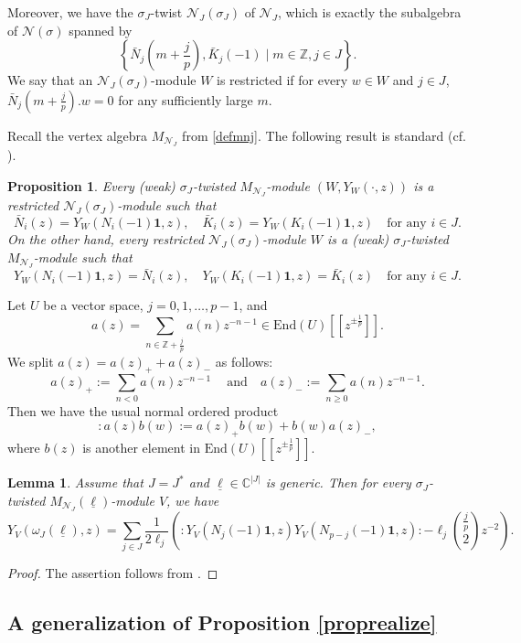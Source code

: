 \documentclass[12pt, reqno]{amsart}
\numberwithin{equation}{section}
\newtheorem{lemma}[theorem]{Lemma}%
\newtheorem{proposition}[theorem]{Proposition}%
\numberwithin{equation}{section}
\def\({\left(}
\def\){\right)}
\newcommand{\C}{\mathbb C}
\newcommand{\Z}{\mathbb{Z}}
\newcommand{\CN}{\mathcal{N}}
\begin{document}
Moreover, we have the $\sigma_J$-twist $\CN_J(\sigma_J)$ of $\CN_J$,
which is exactly the subalgebra of $\CN(\sigma)$ spanned by
\[
\left\{\bar{N}_j(m+\frac{j}{p}), \bar{K}_j(-1) \mid m\in \Z, j\in J\right\}.
\]
We say that an $\CN_J(\sigma_J)$-module $W$ is restricted if for every $w\in W$ and $j\in J$, $\bar{N}_j(m+\frac{j}{p}).w=0$ for any sufficiently large $m$.

Recall the vertex algebra $M_{\CN_J}$ from \eqref{defmnj}.
The following result is standard (cf. \cite{Li,BL}).
\begin{proposition}\label{chartwistmod}
Every (weak) $\sigma_J$-twisted $M_{\CN_J}$-module $(W,Y_W(\cdot,z))$ is a restricted $\CN_J(\sigma_J)$-module such that
\[
\bar{N}_i(z)=Y_W(N_i(-1)\bm{1},z),\quad \bar{K}_i(z)=Y_W(K_i(-1)\bm{1},z)\quad\text{for any }i\in J.
\]
On the other hand, every  restricted $\CN_J(\sigma_J)$-module $W$  is a (weak) $\sigma_J$-twisted $M_{\CN_J}$-module such that
\[
Y_W(N_i(-1)\bm{1},z)=\bar{N}_i(z),\quad Y_W(K_i(-1)\bm{1},z)=\bar{K}_i(z)\quad\text{for any }i\in J.
\]
\end{proposition}


Let $U$ be a vector space, $j=0,1,\dots,p-1$, and
\[a(z)=\sum_{n\in \Z+\frac{j}{p}} a(n)z^{-n-1}\in  \mathrm{End}(U)[[z^{\pm \frac{1}{p}}]].\]
We split $a(z)=a(z)_++a(z)_-$ as follows:
\[
a(z)_+:=\sum_{n<0} a(n)z^{-n-1}\ \quad\text{and}\quad
a(z)_-:=\sum_{n\ge 0} a(n)z^{-n-1}.
\]
Then we have the usual normal ordered product
\[
:a(z)b(w):=a(z)_+b(w)+b(w)a(z)_-,
\]
where $b(z)$ is another element in $\mathrm{End}(U)[[z^{\pm \frac{1}{p}}]]$.

\begin{lemma}
Assume that $J=J^*$ and $\underline{\ell}\in \C^{|J|}$ is generic.
Then for every $\sigma_J$-twisted $M_{\CN_J}(\underline{\ell})$-module $V$, we have
\begin{equation}\label{key}
Y_V(\omega_{J}(\underline{\ell}),z)=\sum_{j\in  J}\frac{1}{2\ell_j}\(:Y_V(N_j(-1){\bm 1},z) Y_V(N_{p-j}(-1){\bm 1},z):
-\ell_j{{\frac{j}{p}}\choose{2}}z^{-2}\).
\end{equation}
\end{lemma}
\begin{proof}
The assertion follows from \cite[(1.14)]{KW}.
\end{proof}


\subsection{A generalization of Proposition \ref{proprealize}}
\end{document}
